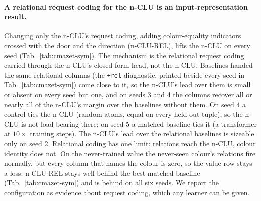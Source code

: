 \documentclass{article} %
\begin{document}
\paragraph{A relational request coding for the n-CLU is an input-representation result.} Changing only the
n-CLU's request coding, adding colour-equality indicators crossed with the door and the direction
(n-CLU-REL), lifts the n-CLU on every seed (Tab.~\ref{tab:cmazet-sym}). The mechanism is the
relational request coding carried through the n-CLU's closed-form head, not the n-CLU. Baselines handed
the same relational columns (the \texttt{+rel} diagnostic, printed beside every seed in
Tab.~\ref{tab:cmazet-sym}) come close to it, so the n-CLU's lead
over them is small or absent on every seed but one, and on seeds 3 and 4 the
columns recover all or nearly all of the n-CLU's margin over the baselines without them. On seed 4 a control
ties the n-CLU (random atoms, equal on every held-out tuple), so the n-CLU is not load-bearing
there; on seed 5 a matched baseline ties it (a transformer at $10\times$ training steps). The n-CLU's lead over the
relational baselines is sizeable only on seed 2. Relational coding has one limit: relations
reach the n-CLU, colour identity does not. On the never-trained value the never-seen colour's
relations fire normally, but every column that names the colour is zero, so the value row stays a
loss: n-CLU-REL stays well behind the best matched baseline (Tab.~\ref{tab:cmazet-sym}) and is %
behind on all six seeds. We report the configuration as evidence about
request coding, which any learner can be given.

\end{document}
